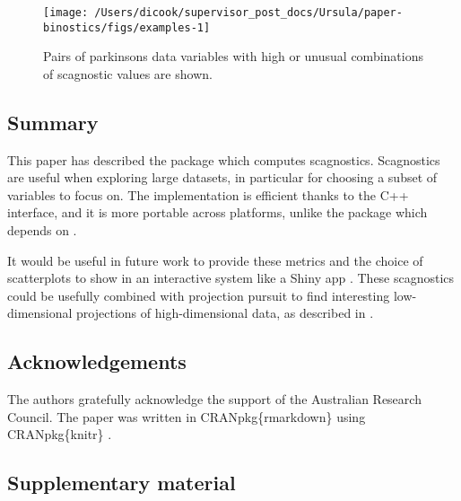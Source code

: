 \begin{Schunk}
\begin{figure}

{\centering \texttt{[image: /Users/dicook/supervisor\_post\_docs/Ursula/paper-binostics/figs/examples-1]} 

}

\caption[Pairs of parkinsons data variables with high or unusual combinations of scagnostic values are shown]{Pairs of parkinsons data variables with high or unusual combinations of scagnostic values are shown. }\label{fig:examples}
\end{figure}
\end{Schunk}

\hypertarget{summary}{%
\subsection{Summary}\label{summary}}

This paper has described the package  which computes
scagnostics. Scagnostics are useful when exploring large datasets, in
particular for choosing a subset of variables to focus on. The
implementation is efficient thanks to the C++ interface, and it is more
portable across platforms, unlike the  package which
depends on .

It would be useful in future work to provide these metrics and the
choice of scatterplots to show in an interactive system like a Shiny app
\citep{shiny}. These scagnostics could be usefully combined with
projection pursuit to find interesting low-dimensional projections of
high-dimensional data, as described in \citet{spinebil}.

\hypertarget{acknowledgements}{%
\subsection{Acknowledgements}\label{acknowledgements}}

The authors gratefully acknowledge the support of the Australian
Research Council. The paper was written in CRANpkg\{rmarkdown\}
\citep{rmarkdown} using CRANpkg\{knitr\} \citep{knitr}.

\hypertarget{supplementary-material}{%
\subsection{Supplementary material}\label{supplementary-material}}

